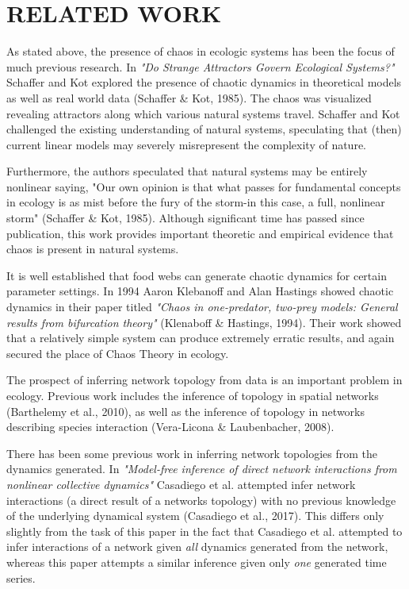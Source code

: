 \documentclass[letterpaper, 10 pt, conference]{ieeeconf}  %
\begin{document}
\section{RELATED WORK}
	As stated above, the presence of chaos in ecologic systems has been the focus of much previous research. In \textit{"Do Strange Attractors Govern Ecological Systems?"} Schaffer and Kot explored the presence of chaotic dynamics in theoretical models as well as real world data (Schaffer \& Kot, 1985). The chaos was visualized revealing attractors along which various natural systems travel. Schaffer and Kot challenged the existing understanding of natural systems, speculating that (then) current linear models may severely misrepresent the complexity of nature. 
    
	Furthermore, the authors speculated that natural systems may be entirely nonlinear saying, "Our own opinion is that what passes for fundamental concepts in ecology is as mist before the fury of the storm-in this case, a full, nonlinear storm" (Schaffer \& Kot, 1985). Although significant time has passed since publication, this work provides important theoretic and empirical evidence that chaos is present in natural systems. 
    
	It is well established that food webs can generate chaotic dynamics for certain parameter settings. In 1994 Aaron Klebanoff and Alan Hastings showed chaotic dynamics in their paper titled \textit{"Chaos in one-predator, two-prey models: General results from bifurcation theory"} (Klenaboff \& Hastings, 1994). Their work showed that a relatively simple system can produce extremely erratic results, and again secured the place of Chaos Theory in ecology. 
  
	The prospect of inferring network topology from data is an important problem in ecology. Previous work includes the inference of topology in spatial networks (Barthelemy et al., 2010), as well as the inference of topology in networks describing species interaction (Vera-Licona \&  Laubenbacher, 2008). 
  
    There has been some previous work in inferring network topologies from the dynamics generated. In \textit{"Model-free inference of direct network interactions from nonlinear collective dynamics"} Casadiego et al. attempted infer network interactions (a direct result of a networks topology) with no previous knowledge of the underlying dynamical system (Casadiego et al., 2017). This differs only slightly from the task of this paper in the fact that Casadiego et al. attempted to infer interactions of a network given \textit{all} dynamics generated from the network, whereas this paper attempts a similar inference given only \textit{one} generated time series. 
    
\end{document}
